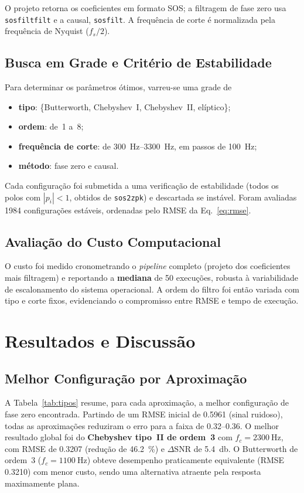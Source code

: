 \documentclass[conference]{IEEEtran}
\begin{document}
O projeto retorna os coeficientes em formato SOS; a filtragem de fase zero usa
\texttt{sosfiltfilt} e a causal, \texttt{sosfilt}. A frequência de corte é
normalizada pela frequência de Nyquist ($f_s/2$).

\subsection{Busca em Grade e Critério de Estabilidade}
Para determinar os parâmetros ótimos, varreu-se uma grade de
\begin{itemize}
  \item \textbf{tipo}: \{Butterworth, Chebyshev~I, Chebyshev~II, elíptico\};
  \item \textbf{ordem}: de~1 a~8;
  \item \textbf{frequência de corte}: de \SIrange{300}{3300}{\hertz}, em passos
        de \SI{100}{\hertz};
  \item \textbf{método}: fase zero e causal.
\end{itemize}
Cada configuração foi submetida a uma verificação de estabilidade (todos os
polos com $|p_i|<1$, obtidos de \texttt{sos2zpk}) e descartada se instável.
Foram avaliadas \num{1984} configurações estáveis, ordenadas pelo RMSE da
Eq.~\eqref{eq:rmse}.

\subsection{Avaliação do Custo Computacional}
O custo foi medido cronometrando o \emph{pipeline} completo (projeto dos
coeficientes mais filtragem) e reportando a \textbf{mediana} de \num{50}
execuções, robusta à variabilidade de escalonamento do sistema operacional. A
ordem do filtro foi então variada com tipo e corte fixos, evidenciando o
compromisso entre RMSE e tempo de execução.

\section{Resultados e Discussão}
\label{sec:resultados}

\subsection{Melhor Configuração por Aproximação}
A Tabela~\ref{tab:tipos} resume, para cada aproximação, a melhor configuração de
fase zero encontrada. Partindo de um RMSE inicial de \num{0.5961} (sinal
ruidoso), todas as aproximações reduziram o erro para a faixa de
\numrange{0.32}{0.36}. O melhor resultado global foi do \textbf{Chebyshev
tipo~II de ordem~3} com $f_c = \SI{2300}{\hertz}$, com RMSE de \num{0.3207}
(redução de \SI{46.2}{\percent}) e $\Delta\mathrm{SNR}$ de
\SI{5.4}{\decibel}. O Butterworth de ordem~3 ($f_c=\SI{1100}{\hertz}$) obteve
desempenho praticamente equivalente (RMSE \num{0.3210}) com menor custo, sendo
uma alternativa atraente pela resposta maximamente plana.
\end{document}

